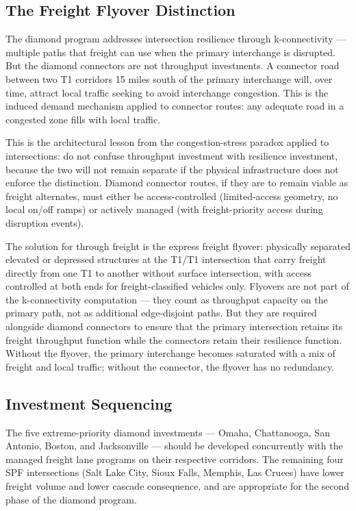\subsection*{The Freight Flyover Distinction}

The diamond program addresses intersection resilience through k-connectivity --- multiple paths that freight can use when the primary interchange is disrupted. But the diamond connectors are not throughput investments. A connector road between two T1 corridors 15 miles south of the primary interchange will, over time, attract local traffic seeking to avoid interchange congestion. This is the induced demand mechanism applied to connector routes: any adequate road in a congested zone fills with local traffic.

This is the architectural lesson from the congestion-stress paradox \citep{ROUTE_A1} applied to intersections: do not confuse throughput investment with resilience investment, because the two will not remain separate if the physical infrastructure does not enforce the distinction. Diamond connector routes, if they are to remain viable as freight alternates, must either be access-controlled (limited-access geometry, no local on/off ramps) or actively managed (with freight-priority access during disruption events).

The solution for through freight is the express freight flyover: physically separated elevated or depressed structures at the T1/T1 intersection that carry freight directly from one T1 to another without surface intersection, with access controlled at both ends for freight-classified vehicles only. Flyovers are not part of the k-connectivity computation --- they count as throughput capacity on the primary path, not as additional edge-disjoint paths. But they are required alongside diamond connectors to ensure that the primary intersection retains its freight throughput function while the connectors retain their resilience function. Without the flyover, the primary interchange becomes saturated with a mix of freight and local traffic; without the connector, the flyover has no redundancy.

\subsection*{Investment Sequencing}

The five extreme-priority diamond investments --- Omaha, Chattanooga, San Antonio, Boston, and Jacksonville --- should be developed concurrently with the managed freight lane programs on their respective corridors. The remaining four SPF intersections (Salt Lake City, Sioux Falls, Memphis, Las Cruces) have lower freight volume and lower cascade consequence, and are appropriate for the second phase of the diamond program.

